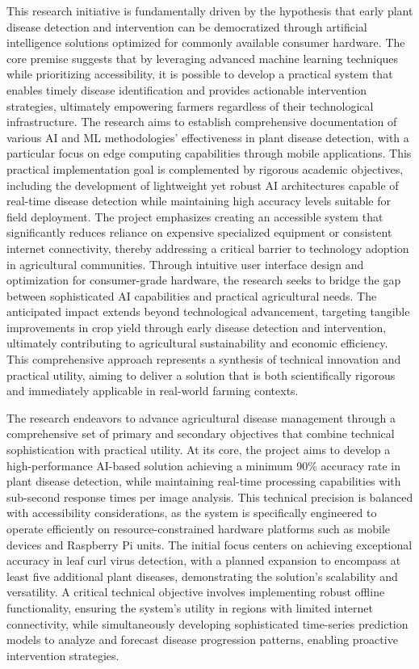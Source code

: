 This research initiative is fundamentally driven by the hypothesis that early plant disease detection and intervention can be democratized through artificial intelligence solutions optimized for commonly available consumer hardware. The core premise suggests that by leveraging advanced machine learning techniques while prioritizing accessibility, it is possible to develop a practical system that enables timely disease identification and provides actionable intervention strategies, ultimately empowering farmers regardless of their technological infrastructure. The research aims to establish comprehensive documentation of various AI and ML methodologies' effectiveness in plant disease detection, with a particular focus on edge computing capabilities through mobile applications. This practical implementation goal is complemented by rigorous academic objectives, including the development of lightweight yet robust AI architectures capable of real-time disease detection while maintaining high accuracy levels suitable for field deployment. The project emphasizes creating an accessible system that significantly reduces reliance on expensive specialized equipment or consistent internet connectivity, thereby addressing a critical barrier to technology adoption in agricultural communities. Through intuitive user interface design and optimization for consumer-grade hardware, the research seeks to bridge the gap between sophisticated AI capabilities and practical agricultural needs. The anticipated impact extends beyond technological advancement, targeting tangible improvements in crop yield through early disease detection and intervention, ultimately contributing to agricultural sustainability and economic efficiency. This comprehensive approach represents a synthesis of technical innovation and practical utility, aiming to deliver a solution that is both scientifically rigorous and immediately applicable in real-world farming contexts.

The research endeavors to advance agricultural disease management through a comprehensive set of primary and secondary objectives that combine technical sophistication with practical utility. At its core, the project aims to develop a high-performance AI-based solution achieving a minimum 90\% accuracy rate in plant disease detection, while maintaining real-time processing capabilities with sub-second response times per image analysis. This technical precision is balanced with accessibility considerations, as the system is specifically engineered to operate efficiently on resource-constrained hardware platforms such as mobile devices and Raspberry Pi units. The initial focus centers on achieving exceptional accuracy in leaf curl virus detection, with a planned expansion to encompass at least five additional plant diseases, demonstrating the solution's scalability and versatility. A critical technical objective involves implementing robust offline functionality, ensuring the system's utility in regions with limited internet connectivity, while simultaneously developing sophisticated time-series prediction models to analyze and forecast disease progression patterns, enabling proactive intervention strategies.

